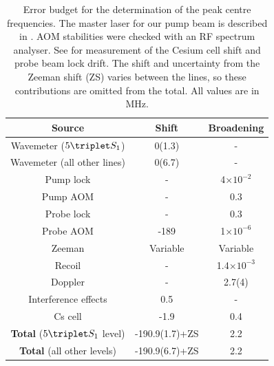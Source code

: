 \begin{table}[b]
\caption{Error budget for the determination of the peak centre frequencies.
	 The master laser for our pump beam is described in \cite{Shin16}.
	AOM stabilities were checked with an RF spectrum analyser.
	See \cite{Thomas20} for measurement of the Cesium cell shift and probe beam lock drift.
	The shift and uncertainty from the Zeeman shift (ZS) varies between the lines, so these contributions are omitted from the total.
	All values are in MHz.}
  \label{tab:errors}
  \begin{tabular}{c c c}
      \hline\hline
          Source & Shift & Broadening  \\
      \hline
          Wavemeter ($5\triplet S_1$)& 0(1.3) & - \\
          Wavemeter (all other lines)& 0(6.7) & - \\
          Pump lock & - & 4$\times10^{-2}$ \\
          Pump AOM & - & 0.3 \\
          Probe lock & - & 0.3\\
          Probe AOM & -189 & 1$\times10^{-6}$\\
          Zeeman & Variable & Variable \\
          Recoil & - & 1.4$\times 10^{-3}$ \\ %
          Doppler & - & 2.7(4) \\
          Interference effects & 0.5 & - \\ 
          Cs cell & -1.9 & 0.4 \\
          \textbf{Total} ($5\triplet S_1$ level) & -190.9(1.7)+ZS& 2.2\\
          \textbf{Total} (all other levels) & -190.9(6.7)+ZS& 2.2\\
      \hline\hline
  \end{tabular}
  
\end{table}



